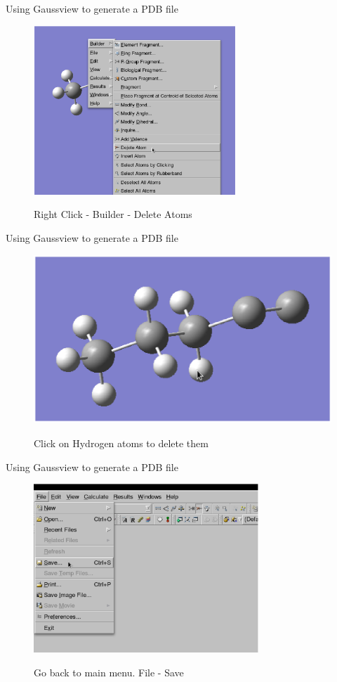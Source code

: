 \documentclass{beamer}
\begin{document}
\begin{frame}{Using Gaussview to generate a PDB file}
\begin{figure}
\begin{center}
\includegraphics[height=2.5in]{gaussian5final.eps}
\end{center}
Right Click - Builder - Delete Atoms
\end{figure}
\end{frame}
\begin{frame}{Using Gaussview to generate a PDB file}
\begin{figure}
\begin{center}
\includegraphics[height=2.5in]{gaussian7final.eps}
\end{center}
Click on Hydrogen atoms to delete them
\end{figure}
\end{frame}
\begin{frame}{Using Gaussview to generate a PDB file}
\begin{figure}
\begin{center}
\includegraphics[height=2.5in]{gaussian8final.eps}
\end{center}
Go back to main menu. File - Save
\end{figure}
\end{frame}
\end{document}
